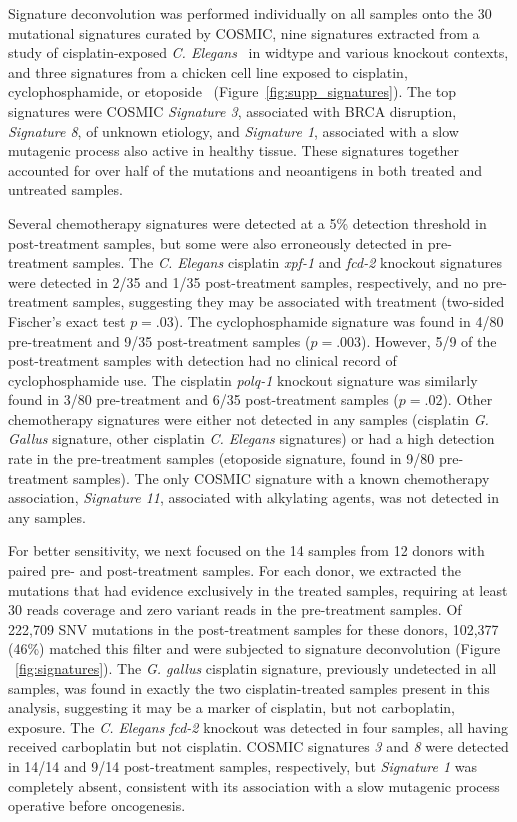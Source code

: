 Signature deconvolution was performed individually on all samples onto the 30 mutational signatures curated by COSMIC\cite{364242}, nine signatures extracted from a study of cisplatin-exposed \textit{C. Elegans}~\cite{Meier_2014} in widtype and various knockout contexts, and three signatures from a chicken cell line exposed to cisplatin, cyclophosphamide, or etoposide~\cite{Szikriszt_2016} (Figure~\ref{fig:supp_signatures}). The top signatures were COSMIC \textit{Signature 3}, associated with BRCA disruption, \textit{Signature 8}, of unknown etiology, and \textit{Signature 1}, associated with a slow mutagenic process also active in healthy tissue. These signatures together accounted for over half of the mutations and neoantigens in both treated and untreated samples.

Several chemotherapy signatures were detected at a 5\% detection threshold in post-treatment samples, but some were also erroneously detected in pre-treatment samples. The \textit{C. Elegans} cisplatin \textit{xpf-1} and \textit{fcd-2} knockout signatures were detected in 2/35 and 1/35 post-treatment samples, respectively, and no pre-treatment samples, suggesting they may be associated with treatment (two-sided Fischer's exact test $p=.03$). The cyclophosphamide signature was found in 4/80 pre-treatment and 9/35 post-treatment samples ($p=.003$). However, 5/9 of the post-treatment samples with detection had no clinical record of cyclophosphamide use. The cisplatin \textit{polq-1} knockout signature was similarly found in 3/80 pre-treatment and 6/35 post-treatment samples ($p=.02$). Other chemotherapy signatures were either not detected in any samples (cisplatin \textit{G. Gallus} signature, other cisplatin \textit{C. Elegans} signatures) or had a high detection rate in the pre-treatment samples (etoposide signature, found in 9/80 pre-treatment samples). The only COSMIC signature with a known chemotherapy association, \textit{Signature 11}, associated with alkylating agents, was not detected in any samples.

For better sensitivity, we next focused on the 14 samples from 12 donors with paired pre- and post-treatment samples. For each donor, we extracted the mutations that had evidence exclusively in the treated samples, requiring at least 30 reads coverage and zero variant reads in the pre-treatment samples. Of 222,709 SNV mutations in the post-treatment samples for these donors, 102,377 (46\%) matched this filter and were subjected to signature deconvolution (Figure ~\ref{fig:signatures}). The \textit{G. gallus} cisplatin signature, previously undetected in all samples, was found in exactly the two cisplatin-treated samples present in this analysis, suggesting it may be a marker of cisplatin, but not carboplatin, exposure. The \textit{C. Elegans} \textit{fcd-2} knockout was detected in four samples, all having received carboplatin but not cisplatin. COSMIC signatures \textit{3} and \textit{8} were detected in 14/14 and 9/14 post-treatment samples, respectively, but \textit{Signature 1} was completely absent, consistent with its association with a slow mutagenic process operative before oncogenesis.

